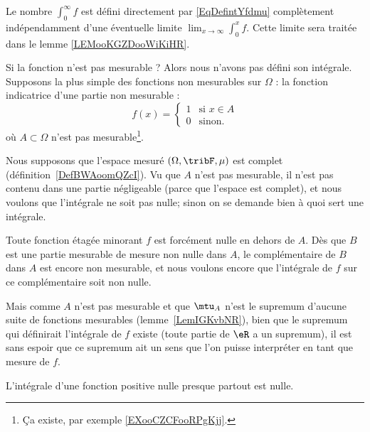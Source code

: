 \begin{normaltext}
	Le nombre \( \int_0^{\infty}f\) est défini directement par \eqref{EqDefintYfdmu} complètement indépendamment d'une éventuelle limite \( \lim_{x\to \infty} \int_{0}^xf\).
	Cette limite sera traitée dans le lemme \ref{LEMooKGZDooWiKiHR}.
\end{normaltext}

\begin{normaltext}      \label{NORMooXTGBooKDnAhZ}
	Si la fonction n'est pas mesurable ? Alors nous n'avons pas défini son intégrale. Supposons la plus simple des fonctions non mesurables sur \( \Omega\) : la fonction indicatrice d'une partie non mesurable :
	\begin{equation}
		f(x)=\begin{cases}
			1 & \text{si } x\in A \\
			0 & \text{sinon. }
		\end{cases}
	\end{equation}
	où \( A\subset \Omega\) n'est pas mesurable\footnote{Ça existe, par exemple \ref{EXooCZCFooRPgKjj}.}.

	Nous supposons que l'espace mesuré \( (\Omega,\tribF,\mu)\) est complet (définition~\ref{DefBWAoomQZcI}). Vu que \( A\) n'est pas mesurable, il n'est pas contenu dans une partie négligeable (parce que l'espace est complet), et nous voulons que l'intégrale ne soit pas nulle; sinon on se demande bien à quoi sert une intégrale.

	Toute fonction étagée minorant \( f\) est forcément nulle en dehors de \( A\). Dès que \( B\) est une partie mesurable de mesure non nulle dans \( A\), le complémentaire de \( B\) dans \( A\) est encore non mesurable, et nous voulons encore que l'intégrale de \( f\) sur ce complémentaire soit non nulle.

	Mais comme \( A\) n'est pas mesurable et que \( \mtu_A\) n'est le supremum d'aucune suite de fonctions mesurables (lemme~\ref{LemIGKvbNR}), bien que le supremum qui définirait l'intégrale de \( f\) existe (toute partie de \( \eR\) a un supremum), il est sans espoir que ce supremum ait un sens que l'on puisse interpréter en tant que mesure de \( f\).
\end{normaltext}

\begin{lemma}  \label{LEMooHAUGooWITETb}
	L'intégrale d'une fonction positive nulle presque partout est nulle.
\end{lemma}

